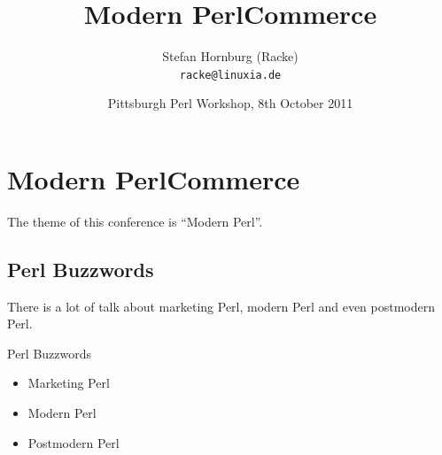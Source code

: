 
\usepackage[T1]{fontenc}
\usepackage{mathptmx}
\usepackage[scaled=.90]{helvet}
\usepackage{courier}

\usepackage{beamerthemesplit}
\usepackage{verbatim}
\usepackage{hyperref}
\usepackage{listings}
\lstset{language=Perl,basicstyle=\footnotesize,tabsize=3,showstringspaces=false}

\title{Modern PerlCommerce}
\author[racke]{Stefan Hornburg (Racke)\\ \texttt{racke@linuxia.de}}
\date[]{Pittsburgh Perl Workshop, 8th October 2011}


\maketitle{}

\begin{frame}
  \titlepage
\end{frame}

\tableofcontents


\section{Modern PerlCommerce}
The theme of this conference is ``Modern Perl''.

\subsection{Perl Buzzwords}
There is a lot of talk about marketing Perl, modern Perl
and even postmodern Perl.

\begin{frame}{Perl Buzzwords}
\begin{itemize}
\item Marketing Perl
\item Modern Perl
\item Postmodern Perl
\end{itemize}
\end{frame}

